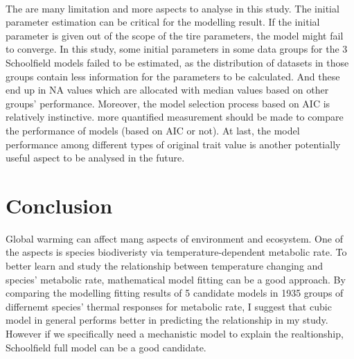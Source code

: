 \documentclass[12pt,a4paper]{article}
\begin{document}
\\
The are many limitation and more aspects to analyse in this study. The initial parameter estimation can be critical for the modelling result. If the initial parameter is given out of the scope of the tire parameters, the model might fail to converge. In this study, some initial parameters in some data groups for the 3 Schoolfield models failed to be estimated, as the distribution of datasets in those groups contain less information for the parameters to be calculated. And these end up in NA values which are allocated with median values based on other groups’ performance.
Moreover, the model selection process based on AIC is relatively instinctive. more quantified measurement should be made to compare the performance of models (based on AIC or not).
At last, the model performance among different types of original trait value is another potentially useful aspect to be analysed in the future.

\section{Conclusion}
Global warming can affect mang aspects of environment and ecosystem. One of the aspects is species biodiveristy via temperature-dependent metabolic rate. To better learn and study the relationship between temperature changing and species' metabolic rate, mathematical model fitting can be a good approach. By comparing the modelling fitting results of 5 candidate models in 1935 groups of differnemt species' thermal responses for metabolic rate, I suggest that cubic model in general performs better in predicting the relationship in my study. However if we specifically need a mechanistic model to explain the realtionship, Schoolfield full model can be a good candidate.

\newpage




\end{document}
